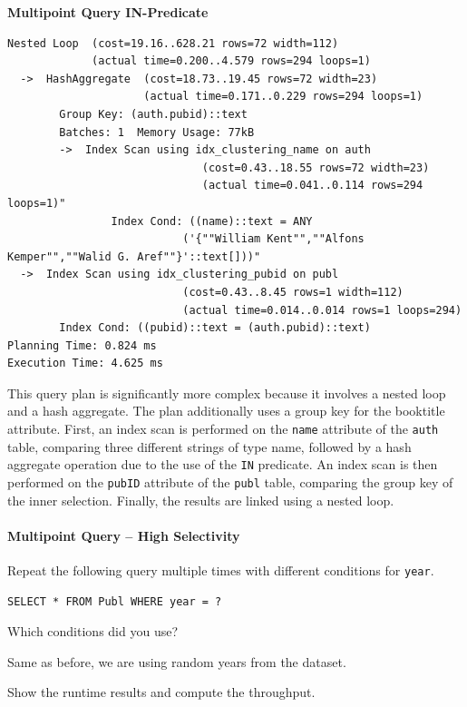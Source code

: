 \documentclass[11pt]{scrartcl}
\begin{document}
\textbf{Multipoint Query IN-Predicate}
{\small
\parskip0pt\begin{verbatim}
Nested Loop  (cost=19.16..628.21 rows=72 width=112)
             (actual time=0.200..4.579 rows=294 loops=1)
  ->  HashAggregate  (cost=18.73..19.45 rows=72 width=23)
                     (actual time=0.171..0.229 rows=294 loops=1)
        Group Key: (auth.pubid)::text
        Batches: 1  Memory Usage: 77kB
        ->  Index Scan using idx_clustering_name on auth
                              (cost=0.43..18.55 rows=72 width=23)
                              (actual time=0.041..0.114 rows=294 loops=1)"
                Index Cond: ((name)::text = ANY
                           ('{""William Kent"",""Alfons Kemper"",""Walid G. Aref""}'::text[]))"
  ->  Index Scan using idx_clustering_pubid on publ
                           (cost=0.43..8.45 rows=1 width=112)
                           (actual time=0.014..0.014 rows=1 loops=294)
        Index Cond: ((pubid)::text = (auth.pubid)::text)
Planning Time: 0.824 ms
Execution Time: 4.625 ms
\end{verbatim}}

This query plan is significantly more complex because it involves a nested loop and a hash aggregate.
The plan additionally uses a group key for the booktitle attribute.
First, an index scan is performed on the \texttt{name} attribute of the \texttt{auth} table, comparing three different strings of type name, followed by a hash aggregate
operation due to the use of the \texttt{IN} predicate.
An index scan is then performed on the \texttt{pubID} attribute of the \texttt{publ} table, comparing the group key of the inner selection.
Finally, the results are linked using a nested loop.


\paragraph{Multipoint Query -- High Selectivity}

Repeat the following query multiple times with different conditions for \texttt{year}.

\begin{lstlisting}[style=dbtsql]
SELECT * FROM Publ WHERE year = ?
\end{lstlisting}

Which conditions did you use?

Same as before, we are using random years from the dataset.

Show the runtime results and compute the throughput.
\end{document}
